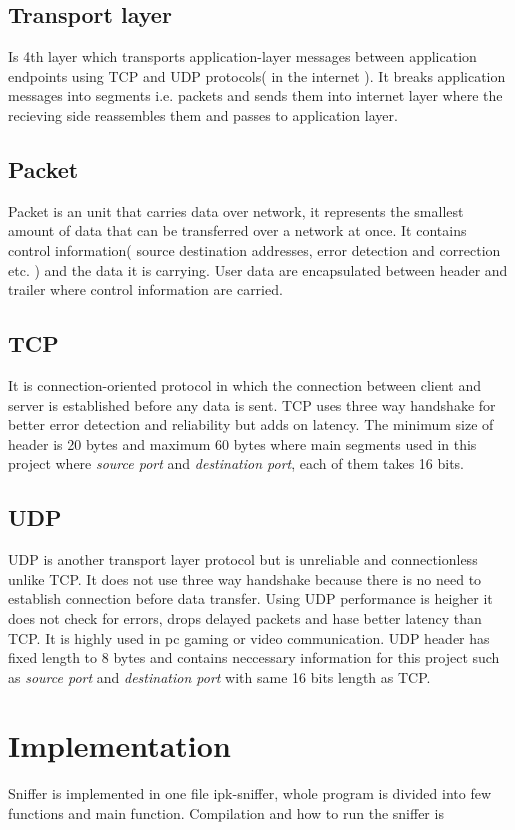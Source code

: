 \documentclass{article}
\begin{document}
\subsection*{Transport layer}
Is 4th layer which transports application-layer messages between application endpoints using TCP and UDP protocols( in the internet ). It breaks application messages into segments i.e. packets and sends them into internet layer where the recieving side reassembles them and passes to application layer.
\subsection*{Packet}
Packet is an unit that carries data over network, it represents the smallest amount of data that can be transferred over a network at once. It contains control information( source destination addresses, error detection and correction etc. ) and the data it is carrying. User data are encapsulated between header and trailer where control information are carried.
\subsection*{TCP}
It is connection-oriented protocol in which the connection between client and server is established before any data is sent. TCP uses three way handshake for better error detection and reliability but adds on latency. The minimum size of header is 20 bytes and maximum 60 bytes where main segments used in this project  where \textit{source port} and \textit{destination port}, each of them takes 16 bits.
\subsection*{UDP}
UDP is another transport layer protocol but is unreliable and connectionless unlike TCP. It does not use three way handshake because there is no need to establish connection before data transfer. Using UDP performance is heigher it does not check for errors, drops delayed packets and hase better latency than TCP. It is highly used in pc gaming or video communication. UDP header has fixed length to 8 bytes and contains neccessary information for this project such as \textit{source port} and \textit{destination port} with same 16 bits length as TCP.
\newpage
\section{Implementation}
	Sniffer is implemented in one file ipk-sniffer, whole program is divided into few 				functions and main function. Compilation and how to run the sniffer is 
\end{document}

